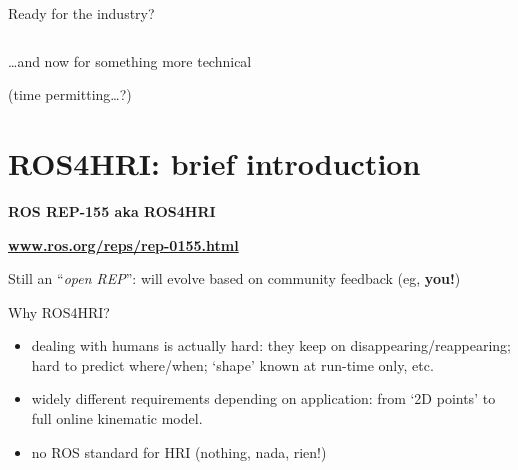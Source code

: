 \documentclass[xcolor=table]{beamer}
\begin{document}
\begin{frame}{Ready for the industry?}
\begin{columns}
\begin{column}{0.5\linewidth}
\begin{center}
            \end{center}
        \end{column}
    \end{columns}


\end{frame}


\begin{frame}[plain]

        {\Large \ldots and now for something more technical}

        (time permitting\ldots?)
\end{frame}

\section{ROS4HRI: brief introduction}

\begin{frame}[plain]{}

    \Large
    \center
    {\bf ROS REP-155 aka ROS4HRI}

    \vspace{1em}
    {\bf \href{https://www.ros.org/reps/rep-0155.html}{www.ros.org/reps/rep-0155.html}}

    Still an ``\emph{open REP}'': will evolve based on community feedback (eg,
    \textbf{you!})\\

\end{frame}

{
\begin{frame}{Why ROS4HRI?}

    \begin{itemize}
        \item  dealing with humans is actually hard: they keep on disappearing/reappearing; hard to predict where/when; ‘shape’ known at run-time only, etc.

\item widely different requirements depending on application: from ‘2D points’ to full online kinematic model.

    \item no ROS standard for HRI (nothing, nada, rien!)
    \end{itemize}

\end{frame}
}
\end{document}
